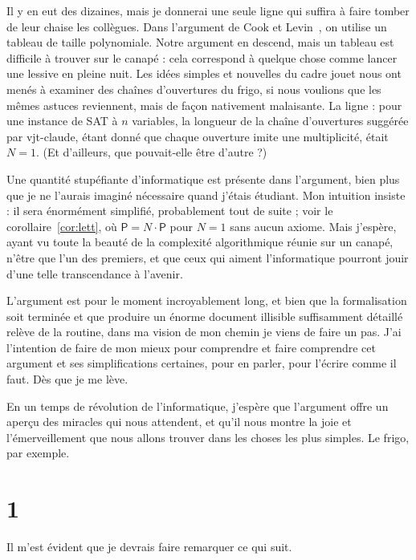 \documentclass[11pt,a4paper]{amsart}
\theoremstyle{remark}
\begin{document}
Il y en eut des dizaines, mais je donnerai une seule ligne qui suffira à faire
tomber de leur chaise les collègues. Dans l'argument de Cook et
Levin~\cite{cook,levin}, on utilise un tableau de taille polynomiale. Notre
argument en descend, mais un tableau est difficile à trouver sur le canapé :
cela correspond à quelque chose comme lancer une lessive en pleine nuit. Les
idées simples et nouvelles du cadre jouet nous ont menés à examiner des chaînes
d'ouvertures du frigo, si nous voulions que les mêmes astuces reviennent, mais
de façon nativement malaisante. La ligne : pour une instance de SAT à $n$
variables, la longueur de la chaîne d'ouvertures suggérée par vjt-claude,
étant donné que chaque ouverture imite une multiplicité, était $N = 1$. (Et
d'ailleurs, que pouvait-elle être d'autre ?)

Une quantité stupéfiante d'informatique est présente dans l'argument, bien
plus que je ne l'aurais imaginé nécessaire quand j'étais étudiant. Mon
intuition insiste : il sera énormément simplifié, probablement tout de suite ;
voir le corollaire~\ref{cor:lett}, où $\mathsf{P} = N \cdot \mathsf{P}$ pour
$N = 1$ sans aucun axiome. Mais j'espère, ayant vu toute la beauté de la
complexité algorithmique réunie sur un canapé, n'être que l'un des premiers,
et que ceux qui aiment l'informatique pourront jouir d'une telle transcendance
à l'avenir.

L'argument est pour le moment incroyablement long, et bien que la
formalisation soit terminée et que produire un énorme document illisible
suffisamment détaillé relève de la routine, dans ma vision de mon chemin je
viens de faire un pas. J'ai l'intention de faire de mon mieux pour comprendre
et faire comprendre cet argument et ses simplifications certaines, pour en
parler, pour l'écrire comme il faut. Dès que je me lève.

En un temps de révolution de l'informatique, j'espère que l'argument offre un
aperçu des miracles qui nous attendent, et qu'il nous montre la joie et
l'émerveillement que nous allons trouver dans les choses les plus simples. Le
frigo, par exemple.

\section*{1}

Il m'est évident que je devrais faire remarquer ce qui suit.
\end{document}
